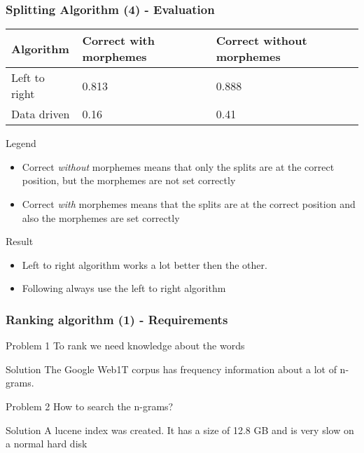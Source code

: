 \documentclass[accentcolor=tud9b, colorbacktitle, inverttitle]{tudbeamer}
\begin{document}
\begin{frame}
  \frametitle{Splitting Algorithm (4) - Evaluation}
\begin{tabular}{| l | l | l |}
  \hline
  \textbf{Algorithm}  & \textbf{Correct with morphemes} & \textbf{Correct without morphemes} \\ \hline
  Left to right & 0.813 & 0.888 \\ \hline
  Data driven & 0.16 & 0.41 \\ \hline
\end{tabular}

\begin{block}{Legend}
  \begin{itemize}
    \item Correct \emph{without} morphemes means that only the splits are at the correct position, but the morphemes are not set correctly
    \item Correct \emph{with} morphemes means that the splits are at the correct position and also the morphemes are set correctly
  \end{itemize}
\end{block}

\begin{block}{Result}
  \begin{itemize}
    \item Left to right algorithm works a lot better then the other.
    \item Following always use the left to right algorithm
  \end{itemize}
\end{block}
\end{frame}

\begin{frame}
  \frametitle{Ranking algorithm (1) - Requirements}
  \begin{block}{Problem 1}
    To rank we need knowledge about the words
  \end{block}
  \begin{block}{Solution}
    The Google Web1T corpus has frequency information about a lot of n-grams.
  \end{block}

  \vspace{30pt}

  \begin{block}{Problem 2}
    How to search the n-grams?
  \end{block}
  \begin{block}{Solution}
    A lucene index was created. It has a size of 12.8 GB and is very slow on a normal hard disk
  \end{block}
\end{frame}
\end{document}
